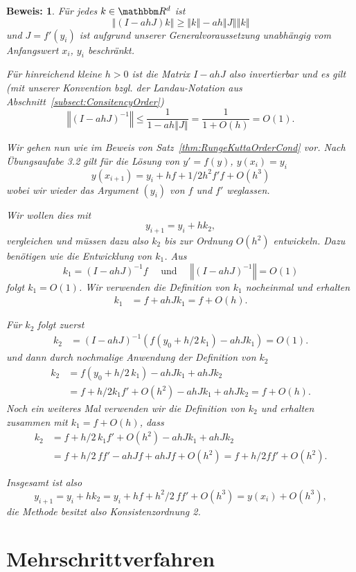 \documentclass[12pt,a4paper]{book}
\theoremstyle{break}
\theoremstyle{nonumberplain}
\newtheorem{beweis}{Beweis:}
\newcommand{\R}{\mathbbm R}
\newcommand{\norm}[1]{\left\Vert#1\right\Vert}		%
\newcommand{\1}{\mathbbm{1}} 			      	%
\begin{document}
\begin{beweis}
Für jedes $k\in \R^d$ ist 
\[
\norm{(I-ahJ)k}\geq \norm{k}-ah\norm{J}\norm{k}
\]
und $J=f'(y_i)$ ist aufgrund unserer Generalvoraussetzung unabhängig vom Anfangswert $x_i$, $y_i$ beschränkt.

Für hinreichend kleine $h>0$ ist die Matrix $I-ahJ$ also invertierbar und es gilt (mit unserer Konvention bzgl. der Landau-Notation aus Abschnitt~\ref{subsect:ConsitencyOrder})
\[
\norm{(I-ahJ)^{-1}}\leq \frac{1}{1-ah\norm{J}}=\frac{1}{1+O(h)}=O(1).
\]

Wir gehen nun wie im Beweis von Satz~\ref{thm:RungeKuttaOrderCond} vor. Nach Übungsaufabe 3.2 gilt 
für die Lösung von $y'=f(y)$, $y(x_i)=y_i$ 
\[
y(x_{i+1})=y_i+h f+1/2 h^2 f' f + O(h^3)
\]
wobei wir wieder das Argument $(y_i)$ von $f$ und $f'$ weglassen.

Wir wollen dies mit 
\[
y_{i+1}=y_i+hk_2,
\]
vergleichen und müssen dazu also $k_2$ bis zur Ordnung $O(h^2)$ entwickeln. Dazu benötigen wie die Entwicklung von $k_1$.
Aus 
\[
k_1=(I-ahJ)^{-1} f\quad \mbox{ und } \quad \norm{(I-ahJ)^{-1}}=O(1)
\]
folgt $k_1=O(1)$. Wir verwenden die Definition von $k_1$ nocheinmal und erhalten 
\begin{align*}
k_1&=f + ahJ k_1=f+O(h).        %
\end{align*}

Für $k_2$ folgt zuerst
\begin{align*}
k_2&= (I-ahJ)^{-1} \left(f(y_0+ h/2\, k_1) - ahJk_1 \right)=O(1).
\end{align*}
und dann durch nochmalige Anwendung der Definition von $k_2$
\begin{align*}
k_2&=f(y_0+ h/2\, k_1) - ahJk_1 + ahJ k_2\\
&=  f + h/2 k_1 f' +O(h^2) - ahJ k_1 + ahJ k_2= f + O(h).
\end{align*}
Noch ein weiteres Mal verwenden wir die Definition von $k_2$ und erhalten zusammen mit $k_1=f+O(h)$, dass
\begin{align*}
k_2&=  f + h/2\, k_1 f' +O(h^2) - ahJ k_1 + ahJ k_2\\
&= f+ h/2\, f f' - ahJ f + ahJ f  +O(h^2)= f+ h/2 f f' +O(h^2).
\end{align*}

Insgesamt ist also
\[
y_{i+1}=y_i+hk_2=y_i+hf+h^2/2\, f f' + O(h^3)=y(x_i)+O(h^3),
\]
die Methode besitzt also Konsistenzordnung 2. 
\end{beweis}


\section{Mehrschrittverfahren}
\end{document}
